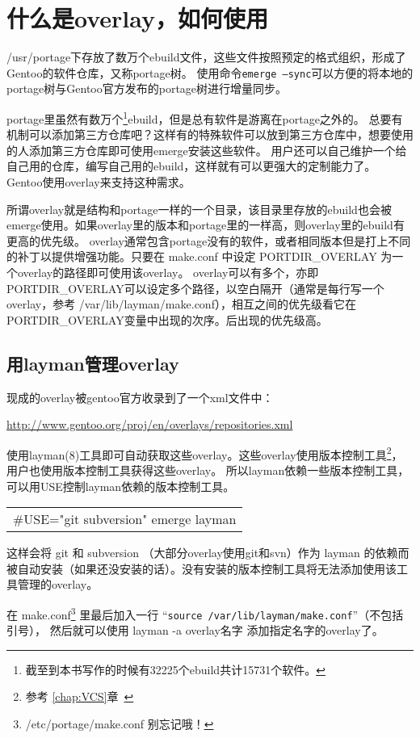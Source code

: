 \documentclass[amstex,twoside]{ctexbook}
\newenvironment{code}{\small\tt\begin{longtable}{p{0.8\textwidth}}}{\end{longtable}}
\newcommand{\chapref}[1]{ { \it第\ref{#1}章~\nameref{#1}} }
\begin{document}
\section{什么是overlay，如何使用}\label{sec:overlay}

/usr/portage下存放了数万个ebuild文件，这些文件按照预定的格式组织，形成了Gentoo的软件仓库，又称portage树。
使用命令{\tt emerge --sync}可以方便的将本地的portage树与Gentoo官方发布的portage树进行增量同步。

portage里虽然有数万个\footnote{截至到本书写作的时候有32225个ebuild共计15731个软件。}ebuild，但是总有软件是游离在portage之外的。
总要有机制可以添加第三方仓库吧？这样有的特殊软件可以放到第三方仓库中，想要使用的人添加第三方仓库即可使用emerge安装这些软件。
用户还可以自己维护一个给自己用的仓库，编写自己用的ebuild，这样就有可以更强大的定制能力了。
Gentoo使用overlay来支持这种需求。

所谓overlay就是结构和portage一样的一个目录，该目录里存放的ebuild也会被emerge使用。如果overlay里的版本和portage里的一样高，则overlay里的ebuild有更高的优先级。
overlay通常包含portage没有的软件，或者相同版本但是打上不同的补丁以提供增强功能。只要在 make.conf 中设定 PORTDIR\_OVERLAY 为一个overlay的路径即可使用该overlay。
overlay可以有多个，亦即PORTDIR\_OVERLAY可以设定多个路径，以空白隔开（通常是每行写一个overlay，参考 /var/lib/layman/make.conf），相互之间的优先级看它在PORTDIR\_OVERLAY变量中出现的次序。后出现的优先级高。

\subsection{用layman管理overlay}

现成的overlay被gentoo官方收录到了一个xml文件中：

\url{http://www.gentoo.org/proj/en/overlays/repositories.xml}

使用layman(8)工具即可自动获取这些overlay。这些overlay使用版本控制工具\footnote{参考 \chapref{chap:VCS}}，用户也使用版本控制工具获得这些overlay。
所以layman依赖一些版本控制工具，可以用USE控制layman依赖的版本控制工具。

\begin{code}
\#USE="git subversion" emerge layman
\end{code}

这样会将 git 和 subversion （大部分overlay使用git和svn）作为 layman 的依赖而被自动安装（如果还没安装的话）。没有安装的版本控制工具将无法添加使用该工具管理的overlay。

在 make.conf\footnote{ /etc/portage/make.conf 别忘记哦！} 里最后加入一行 “{\tt source /var/lib/layman/make.conf}”（不包括引号）， 然后就可以使用 layman -a overlay名字 添加指定名字的overlay了。
\end{document}
